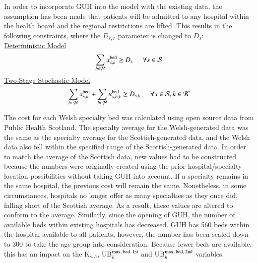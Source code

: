 \documentclass[../thesis.tex]{subfiles}
\begin{document}
In order to incorporate GUH into the model with the existing data, the assumption has been made that patients will be admitted to any hospital within the health board and the regional restrictions are lifted. This results in the following constraints, where the $D_{s,r}$ parameter is changed to $D_{s}$:\\
\underline{Deterministic Model}
\begin{equation}
    \sum_{h\in\mathcal{H}} x^\textnormal{bed}_{s,h}\geq D_{s}  \hspace{0.5cm} \forall  s \in \mathcal{S}
\end{equation}
\underline{Two-Stage Stochastic Model}
\begin{equation}
    \sum_{h\in\mathcal{H}} x^\textnormal{bed}_{s,h} +  \sum_{h\in\mathcal{H}} u^\textnormal{bed}_{s,h,k} \geq D_{s,k} \hspace{0.5cm} \forall s \in \mathcal{S}, k \in \mathcal{K}\\
\end{equation}

The cost for each Welsh specialty bed was calculated using open source data from Public Health Scotland. The specialty average for the Welsh-generated data was the same as the specialty average for the Scottish-generated data, and the Welsh data also fell within the specified range of the Scottish-generated data. In order to match the average of the Scottish data, new values had to be constructed because the numbers were originally created using the prior hospital/specialty location possibilities without taking GUH into account. If a specialty remains in the same hospital, the previous cost will remain the same. Nonetheless, in some circumstances, hospitals no longer offer as many specialties as they once did, falling short of the Scottish average. As a result, these values are altered to conform to the average. Similarly, since the opening of GUH, the number of available beds within existing hospitals has decreased. GUH has 560 beds within the hospital available to all patients, however, the number has been scaled down to 300 to take the age group into consideration. Because fewer beds are available, this has an impact on the K$_{s,h}$, UB$^\textnormal{max, bed, 1st}_{h}$ and UB$^\textnormal{max, bed, 2nd}_{h}$ variables.
\end{document}
